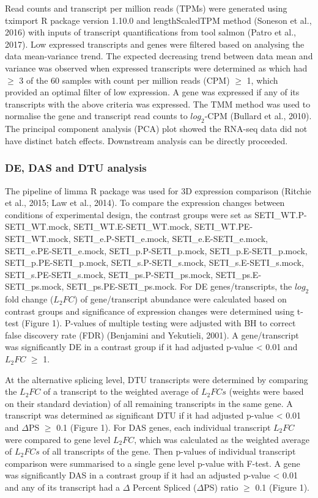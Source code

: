 \documentclass[]{article}
\begin{document}
Read counts and transcript per million reads (TPMs) were generated using
tximport R package version 1.10.0 and lengthScaledTPM method (Soneson et
al., 2016) with inputs of transcript quantifications from tool salmon
(Patro et al., 2017). Low expressed transcripts and genes were filtered
based on analysing the data mean-variance trend. The expected decreasing
trend between data mean and variance was observed when expressed
transcripts were determined as which had \(\geq\) 3 of the 60 samples
with count per million reads (CPM) \(\geq\) 1, which provided an optimal
filter of low expression. A gene was expressed if any of its transcripts
with the above criteria was expressed. The TMM method was used to
normalise the gene and transcript read counts to \(log_2\)-CPM (Bullard
et al., 2010). The principal component analysis (PCA) plot showed the
RNA-seq data did not have distinct batch effects. Downstream analysis
can be directly proceeded.

\subsubsection{DE, DAS and DTU analysis}\label{de-das-and-dtu-analysis}

The pipeline of limma R package was used for 3D expression comparison
(Ritchie et al., 2015; Law et al., 2014). To compare the expression
changes between conditions of experimental design, the contrast groups
were set as SETI\_WT.P-SETI\_WT.mock, SETI\_WT.E-SETI\_WT.mock,
SETI\_WT.PE-SETI\_WT.mock, SETI\_e.P-SETI\_e.mock,
SETI\_e.E-SETI\_e.mock, SETI\_e.PE-SETI\_e.mock, SETI\_p.P-SETI\_p.mock,
SETI\_p.E-SETI\_p.mock, SETI\_p.PE-SETI\_p.mock, SETI\_s.P-SETI\_s.mock,
SETI\_s.E-SETI\_s.mock, SETI\_s.PE-SETI\_s.mock,
SETI\_ps.P-SETI\_ps.mock, SETI\_ps.E-SETI\_ps.mock,
SETI\_ps.PE-SETI\_ps.mock. For DE genes/transcripts, the \(log_2\) fold
change (\(L_2FC\)) of gene/transcript abundance were calculated based on
contrast groups and significance of expression changes were determined
using t-test (Figure 1). P-values of multiple testing were adjusted with
BH to correct false discovery rate (FDR) (Benjamini and Yekutieli,
2001). A gene/transcript was significantly DE in a contrast group if it
had adjusted p-value \textless{} 0.01 and \(L_2FC\) \(\geq\) 1.

At the alternative splicing level, DTU transcripts were determined by
comparing the \(L_2FC\) of a transcript to the weighted average of
\(L_2FCs\) (weights were based on their standard deviation) of all
remaining transcripts in the same gene. A transcript was determined as
significant DTU if it had adjusted p-value \textless{} 0.01 and
\(\Delta\)PS \(\geq\) 0.1 (Figure 1). For DAS genes, each individual
transcript \(L_2FC\) were compared to gene level \(L_2FC\), which was
calculated as the weighted average of \(L_2FCs\) of all transcripts of
the gene. Then p-values of individual transcript comparison were
summarised to a single gene level p-value with F-test. A gene was
significantly DAS in a contrast group if it had an adjusted p-value
\textless{} 0.01 and any of its transcript had a \(\Delta\) Percent
Spliced (\(\Delta\)PS) ratio \(\geq\) 0.1 (Figure 1).
\end{document}
